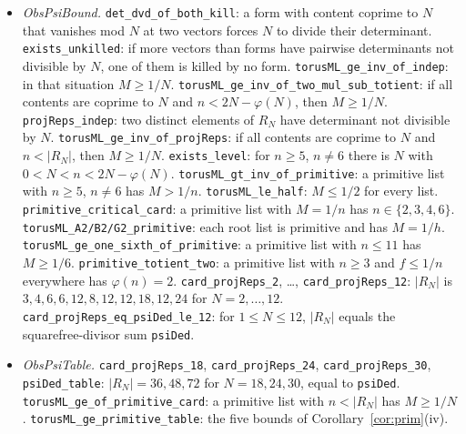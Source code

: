 \documentclass[11pt]{amsart}
\theoremstyle{definition}
\theoremstyle{remark}
\newcommand{\lean}[1]{\texttt{#1}}
\begin{document}
{\begin{itemize}[leftmargin=1.5em,itemsep=0pt]
\item \emph{ObsPsiBound.} \lean{det\_dvd\_of\_both\_kill}: a form with content coprime to $N$ that vanishes mod $N$ at two vectors forces $N$ to divide their determinant. \lean{exists\_unkilled}: if more vectors than forms have pairwise determinants not divisible by $N$, one of them is killed by no form. \lean{torusML\_ge\_inv\_of\_indep}: in that situation $M\ge1/N$. \lean{torusML\_ge\_inv\_of\_two\_mul\_sub\_totient}: if all contents are coprime to $N$ and $n<2N-\varphi(N)$, then $M\ge1/N$. \lean{projReps\_indep}: two distinct elements of $R_N$ have determinant not divisible by $N$. \lean{torusML\_ge\_inv\_of\_projReps}: if all contents are coprime to $N$ and $n<|R_N|$, then $M\ge1/N$. \lean{exists\_level}: for $n\ge5$, $n\ne6$ there is $N$ with $0<N<n<2N-\varphi(N)$. \lean{torusML\_gt\_inv\_of\_primitive}: a primitive list with $n\ge5$, $n\ne6$ has $M>1/n$. \lean{torusML\_le\_half}: $M\le1/2$ for every list. \lean{primitive\_critical\_card}: a primitive list with $M=1/n$ has $n\in\{2,3,4,6\}$. \lean{torusML\_A2/B2/G2\_primitive}: each root list is primitive and has $M=1/h$. \lean{torusML\_ge\_one\_sixth\_of\_primitive}: a primitive list with $n\le11$ has $M\ge1/6$. \lean{primitive\_totient\_two}: a primitive list with $n\ge3$ and $f\le1/n$ everywhere has $\varphi(n)=2$. \lean{card\_projReps\_2}, \dots, \lean{card\_projReps\_12}: $|R_N|$ is $3,4,6,6,12,8,12,12,18,12,24$ for $N=2,\dots,12$. \lean{card\_projReps\_eq\_psiDed\_le\_12}: for $1\le N\le12$, $|R_N|$ equals the squarefree-divisor sum \lean{psiDed}.
\item \emph{ObsPsiTable.} \lean{card\_projReps\_18}, \lean{card\_projReps\_24}, \lean{card\_projReps\_30}, \lean{psiDed\_table}: $|R_N|=36,48,72$ for $N=18,24,30$, equal to \lean{psiDed}. \lean{torusML\_ge\_of\_primitive\_card}: a primitive list with $n<|R_N|$ has $M\ge1/N$. \lean{torusML\_ge\_primitive\_table}: the five bounds of Corollary~\ref{cor:prim}(iv).
\end{itemize}}
\end{document}
